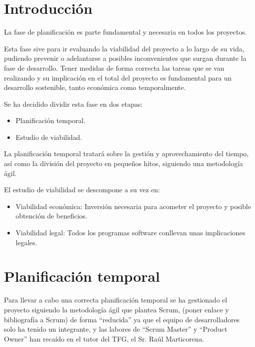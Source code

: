 
\section{Introducción}

La fase de planificación es parte fundamental y necesaria en todos los proyectos.

Esta fase sive para ir evaluando la viabilidad del proyecto a lo largo de su vida, pudiendo prevenir o adelantarse a posibles inconvenientes que surgan durante la fase de desarrollo.
Tener medidas de forma correcta las tareas que se van realizando y su implicación en el total del proyecto es fundamental para un desarrollo sostenible, tanto económica como temporalmente.

Se ha decidido dividir esta fase en dos etapas:

\begin{itemize}
	\item
	Planificación temporal.
	\item
	Estudio de viabilidad.
\end{itemize}

La planificación temporal tratará sobre la gestión y aprovechamiento del tiempo, así como la división del proyecto en pequeños hitos, siguiendo una metodología ágil.

El estudio de viabilidad se descompone a su vez en:

\begin{itemize}
	\item
	Viabilidad económica: Inversión necesaria para acometer el proyecto y posible obtención de beneficios.
	\item
	Viabilidad legal: Todos los programas software conllevan unas implicaciones legales.
\end{itemize}

\section{Planificación temporal}

Para llevar a cabo una correcta planificación temporal se ha gestionado el proyecto siguiendo la metodología ágil que plantea Scrum, (poner enlace y bibliografía a Scrum) de forma ``reducida'' ya que el equipo de desarrolladores solo ha tenido un integrante, y las labores de ``Scrum Master'' y ``Product Owner'' han recaído en el tutor del TFG, el Sr. Raúl Marticorena.


